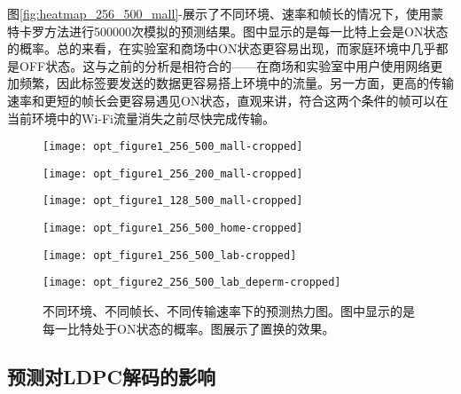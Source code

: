 图\ref{fig:heatmap_256_500_mall}-展示了不同环境、速率和帧长的情况下，使用蒙特卡罗方法进行500000次模拟的预测结果。图中显示的是每一比特上会是ON状态的概率。总的来看，在实验室和商场中ON状态更容易出现，而家庭环境中几乎都是OFF状态。这与之前的分析是相符合的——在商场和实验室中用户使用网络更加频繁，因此标签要发送的数据更容易搭上环境中的流量。另一方面，更高的传输速率和更短的帧长会更容易遇见ON状态，直观来讲，符合这两个条件的帧可以在当前环境中的Wi-Fi流量消失之前尽快完成传输。
\begin{figure}[t]
	\begin{minipage}[b]{.32\linewidth}
		\texttt{[image: opt\_figure1\_256\_500\_mall-cropped]}
		\label{fig:heatmap_256_500_mall}
	\end{minipage}
	\hfill
	\begin{minipage}[b]{.32\linewidth}
		\texttt{[image: opt\_figure1\_256\_200\_mall-cropped]}
		\label{fig:heatmap_256_200_mall}
	\end{minipage}
	\hfill
	\begin{minipage}[b]{.32\linewidth}
		\texttt{[image: opt\_figure1\_128\_500\_mall-cropped]}
		\label{fig:heatmap_128_500_mall}
	\end{minipage}
	
	\begin{minipage}[b]{.32\linewidth}
		\texttt{[image: opt\_figure1\_256\_500\_home-cropped]}
		\label{fig:heatmap_256_500_home}
	\end{minipage}
	\hfill
	\begin{minipage}[b]{.32\linewidth}
		\texttt{[image: opt\_figure1\_256\_500\_lab-cropped]}
		\label{fig:heatmap_256_500_lab}
	\end{minipage}
	\hfill
	\begin{minipage}[b]{.32\linewidth}
		\texttt{[image: opt\_figure2\_256\_500\_lab\_deperm-cropped]}
		\label{fig:heatmap_perm}
	\end{minipage}
	\caption{不同环境、不同帧长、不同传输速率下的预测热力图。图中显示的是每一比特处于ON状态的概率。图展示了置换的效果。}\label{fig:heatmap}
\end{figure}

\subsection{预测对LDPC解码的影响}

